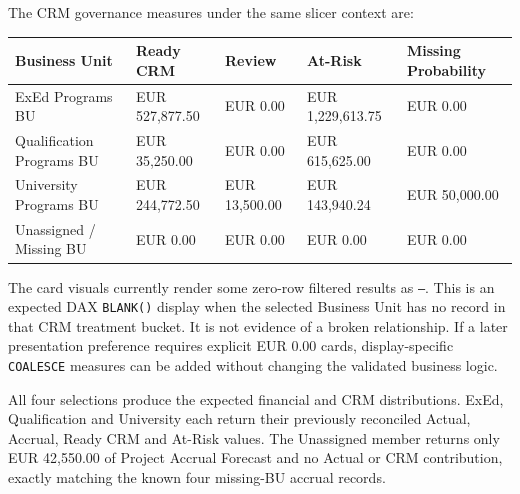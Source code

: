 \documentclass[11pt,a4paper]{article}
\begin{document}
The CRM governance measures under the same slicer context are:

\begin{tabularx}{\textwidth}{
    >{\raggedright\arraybackslash}p{3.5cm}
    >{\raggedleft\arraybackslash}p{2.7cm}
    >{\raggedleft\arraybackslash}p{2.7cm}
    >{\raggedleft\arraybackslash}p{2.7cm}
    >{\raggedleft\arraybackslash}X
}

\toprule

Business Unit
&
Ready CRM
&
Review
&
At-Risk
&
Missing Probability
\\

\midrule

ExEd Programs BU
&
EUR 527,877.50
&
EUR 0.00
&
EUR 1,229,613.75
&
EUR 0.00
\\

Qualification Programs BU
&
EUR 35,250.00
&
EUR 0.00
&
EUR 615,625.00
&
EUR 0.00
\\

University Programs BU
&
EUR 244,772.50
&
EUR 13,500.00
&
EUR 143,940.24
&
EUR 50,000.00
\\

Unassigned / Missing BU
&
EUR 0.00
&
EUR 0.00
&
EUR 0.00
&
EUR 0.00
\\

\bottomrule

\end{tabularx}

The card visuals currently render some zero-row filtered results as
\texttt{--}. This is an expected DAX \texttt{BLANK()} display when the selected
Business Unit has no record in that CRM treatment bucket. It is not evidence of
a broken relationship. If a later presentation preference requires explicit
EUR 0.00 cards, display-specific \texttt{COALESCE} measures can be added without
changing the validated business logic.

\begin{successbox}

\textbf{\color{SuccessGreen}{Business Unit Slicer Validation Result}}

All four selections produce the expected financial and CRM distributions.
ExEd, Qualification and University each return their previously reconciled
Actual, Accrual, Ready CRM and At-Risk values. The Unassigned member returns
only EUR 42,550.00 of Project Accrual Forecast and no Actual or CRM contribution,
exactly matching the known four missing-BU accrual records.

\end{successbox}
\end{document}

